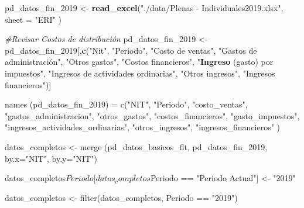 \documentclass[
  11pt,
]{book}
\newenvironment{Shaded}{\begin{snugshade}}{\end{snugshade}}
\newcommand{\CommentTok}[1]{\textcolor[rgb]{0.56,0.35,0.01}{\textit{#1}}}
\newcommand{\DataTypeTok}[1]{\textcolor[rgb]{0.13,0.29,0.53}{#1}}
\newcommand{\DecValTok}[1]{\textcolor[rgb]{0.00,0.00,0.81}{#1}}
\newcommand{\KeywordTok}[1]{\textcolor[rgb]{0.13,0.29,0.53}{\textbf{#1}}}
\newcommand{\NormalTok}[1]{#1}
\newcommand{\StringTok}[1]{\textcolor[rgb]{0.31,0.60,0.02}{#1}}
\begin{document}
\begin{Shaded}
\begin{Highlighting}[]
\NormalTok{pd_datos_fin_}\DecValTok{2019}\NormalTok{ <-}\StringTok{ }\KeywordTok{read_excel}\NormalTok{(}\StringTok{"./data/Plenas - Individuales2019.xlsx"}\NormalTok{,}
                                \DataTypeTok{sheet =} \StringTok{"ERI"}\NormalTok{ )}

\CommentTok{#Revisar Costos de distribución}
\NormalTok{pd_datos_fin_}\DecValTok{2019}\NormalTok{ <-}\StringTok{ }\NormalTok{pd_datos_fin_}\DecValTok{2019}\NormalTok{[,}\KeywordTok{c}\NormalTok{(}\StringTok{"Nit"}\NormalTok{, }\StringTok{"Periodo"}\NormalTok{, }\StringTok{"Costo de ventas"}\NormalTok{, }
  \StringTok{"Gastos de administración", "}\NormalTok{Otros gastos}\StringTok{", "}\NormalTok{Costos financieros}\StringTok{", }
\StringTok{  "}\KeywordTok{Ingreso}\NormalTok{ (gasto) por impuestos}\StringTok{", "}\NormalTok{Ingresos de actividades ordinarias}\StringTok{", }
\StringTok{  "}\NormalTok{Otros ingresos}\StringTok{", "}\NormalTok{Ingresos financieros}\StringTok{")]}

\StringTok{names (pd_datos_fin_2019) = c("}\NormalTok{NIT}\StringTok{", "}\NormalTok{Periodo}\StringTok{", "}\NormalTok{costo_ventas}\StringTok{", }
\StringTok{  "}\NormalTok{gastos_administracion}\StringTok{", "}\NormalTok{otros_gastos}\StringTok{", "}\NormalTok{costos_financieros}\StringTok{", }
\StringTok{  "}\NormalTok{gasto_impuestos}\StringTok{", "}\NormalTok{ingresos_actividades_ordinarias}\StringTok{", "}\NormalTok{otros_ingresos}\StringTok{",}
\StringTok{  "}\NormalTok{ingresos_financieros}\StringTok{" )}

\StringTok{datos_completos <- merge (pd_datos_basicos_flt, pd_datos_fin_2019,}
\StringTok{                          by.x="}\NormalTok{NIT}\StringTok{", by.y="}\NormalTok{NIT}\StringTok{")}

\StringTok{datos_completos$Periodo[datos_completos$Periodo == "}\NormalTok{Periodo Actual}\StringTok{"] <- "}\DecValTok{2019}\StringTok{"}

\StringTok{datos_completos <- filter(datos_completos, Periodo == "}\DecValTok{2019}\StringTok{")}
\end{Highlighting}
\end{Shaded}
\end{document}

